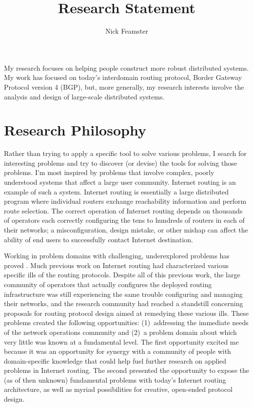 \documentclass{article}
\begin{document}
\title{Research Statement}
\author{Nick Feamster}
\maketitle

My research focuses on helping people construct more robust distributed
systems.  My work has focused on today's interdomain routing protocol,
Border Gateway Protocol version 4 (BGP), but, more generally, my
research interests involve the analysis and design of large-scale
distributed systems.  


\section*{Research Philosophy}

Rather than trying to apply a specific tool to solve various problems, I
search for interesting problems and try to discover (or devise) the
tools for solving those problems.  I'm most inspired by problems that
involve complex, poorly understood systems that affect a large user
community.  Internet routing is an example of such a system.  Internet
routing is essentially a large distributed program where individual
routers exchange reachability information and perform route selection.
The correct operation of Internet routing depends on thousands of
operators each correctly configuring the tens to hundreds of routers in
each of their networks; a misconfiguration, design mistake, or other
mishap can affect the ability of end users to successfully contact
Internet destination.

Working in problem domains with
challenging, underexplored problems has proved .  
Much previous work on Internet routing had characterized various
specific ills of the routing protocols.  Despite all of this previous
work, the large community of operators that actually configures the
deployed routing infrastructure was still experiencing the same trouble
configuring and managing their networks, and the research community had
reached a standstill concerning proposals for routing protocol design
aimed at remedying these various ills.  These problems created the
following opportunities: (1)~addressing the immediate needs of the
network operations community and (2)~a problem domain about which very
little was known at a fundamental level.  The first opportunity excited
me because it was an opportunity for synergy with a community of people
with domain-specific knowledge that could help fuel further research on
applied problems in Internet routing.  The second presented the
opportunity to expose the (as of then unknown) fundamental problems with
today's Internet routing architecture, as well as myriad possibilities
for creative, open-ended protocol design.
\end{document}
